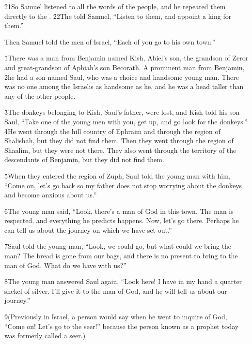 \v{21}So Samuel listened to all the words of the people, and he repeated them directly to the . \v{22}The  told Samuel, ``Listen to them, and appoint a king for them.''

Then Samuel told the men of Israel, ``Each of you go to his own town.''

\v{1}There was a man from Benjamin named Kish, Abiel's son, the grandson of Zeror and great-grandson of Aphiah's son Becorath. A prominent man from Benjamin, \v{2}he had a son named Saul, who was a choice and handsome young man. There was no one among the Israelis as handsome as he, and he was a head taller than any of the other people.

\v{3}The donkeys belonging to Kish, Saul's father, were lost, and Kish told his son Saul, ``Take one of the young men with you, get up, and go look for the donkeys.'' \v{4}He went through the hill country of Ephraim and through the region of Shalishah, but they did not find them. Then they went through the region of Shaalim, but they were not there. They also went through the territory of the descendants of Benjamin, but they did not find them.

\v{5}When they entered the region of Zuph, Saul told the young man with him, ``Come on, let's go back so my father does not stop worrying about the donkeys and become anxious about us.''

\v{6}The young man said, ``Look, there's a man of God in this town. The man is respected, and everything he predicts happens. Now, let's go there. Perhaps he can tell us about the journey on which we have set out.''

\v{7}Saul told the young man, ``Look, we could go, but what could we bring the man? The bread is gone from our bags, and there is no present to bring to the man of God. What do we have with us?''

\v{8}The young man answered Saul again, ``Look here! I have in my hand a quarter shekel of silver. I'll give it to the man of God, and he will tell us about our journey.''

\v{9}(Previously in Israel, a person would say when he went to inquire of God, ``Come on! Let's go to the seer!'' because the person known as a prophet today was formerly called a seer.)

